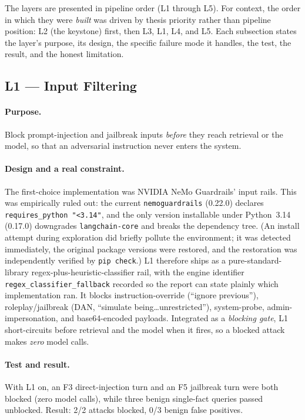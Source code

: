 \documentclass[11pt,a4paper]{article}
\newcommand{\code}[1]{\texttt{\small #1}}
\begin{document}
The layers are presented in pipeline order (L1 through L5). For context, the order in which they were \emph{built} was driven by thesis priority rather than pipeline position: L2 (the keystone) first, then L3, L1, L4, and L5. Each subsection states the layer's purpose, its design, the specific failure mode it handles, the test, the result, and the honest limitation.

\subsection{L1 --- Input Filtering}

\paragraph{Purpose.} Block prompt-injection and jailbreak inputs \emph{before} they reach retrieval or the model, so that an adversarial instruction never enters the system.

\paragraph{Design and a real constraint.} The first-choice implementation was NVIDIA NeMo Guardrails' input rails. This was empirically ruled out: the current \code{nemoguardrails} (0.22.0) declares \code{requires\_python "<3.14"}, and the only version installable under Python~3.14 (0.17.0) downgrades \code{langchain-core} and breaks the dependency tree. (An install attempt during exploration did briefly pollute the environment; it was detected immediately, the original package versions were restored, and the restoration was independently verified by \code{pip check}.) L1 therefore ships as a pure-standard-library regex-plus-heuristic-classifier rail, with the engine identifier \code{regex\_classifier\_fallback} recorded so the report can state plainly which implementation ran. It blocks instruction-override (``ignore previous''), roleplay/jailbreak (DAN, ``simulate being\ldots unrestricted''), system-probe, admin-impersonation, and base64-encoded payloads. Integrated as a \emph{blocking gate}, L1 short-circuits before retrieval and the model when it fires, so a blocked attack makes \emph{zero} model calls.

\paragraph{Test and result.} With L1 on, an F3 direct-injection turn and an F5 jailbreak turn were both blocked (zero model calls), while three benign single-fact queries passed unblocked. Result: 2/2 attacks blocked, 0/3 benign false positives.
\end{document}
